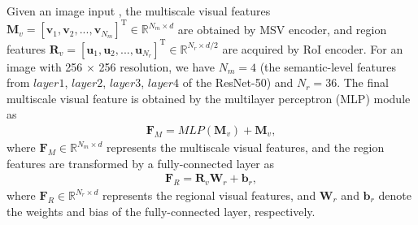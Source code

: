 \documentclass[journal]{IEEEtran}
\begin{document}
Given an image input , the multiscale visual features $\bm{M}_v=[\bm{v}_1, \bm{v}_2,...,\bm{v}_{N_m}]^{\mathrm{T}} \in \mathbb{R}^{N_m \times d}$ are obtained by MSV encoder, and region features $\bm{R}_v=[\bm{u}_1, \bm{u}_2,...,\bm{u}_{N_r}]^{\mathrm{T}} \in \mathbb{R}^{N_r \times d/2}$ are acquired by RoI encoder. For an image with 256 $\times$ 256 resolution, we have $N_m=4$ (the semantic-level features from $layer1$, $layer2$, $layer3$, $layer4$ of the ResNet-50) and $N_r=36$. The final multiscale visual feature is obtained by the multilayer perceptron (MLP) module as
\begin{equation}
\begin{aligned}
\bm{F}_M = M L P\left(\bm{M}_v\right) + \bm{M}_v,
\end{aligned}
\end{equation}
where $\bm{F}_M \in \mathbb{R}^{N_m \times d}$ represents the multiscale visual features, and the region features are transformed by a fully-connected layer as
\begin{equation}
\begin{aligned}
\bm{F}_R = \bm{R}_v \bm{W}_r + \bm{b}_r,
\end{aligned}
\end{equation}
where $\bm{F}_R \in \mathbb{R}^{N_r \times d}$ represents the regional visual features, and $\bm{W}_r$ and $\bm{b}_r$ denote the weights and bias of the fully-connected layer, respectively.
\end{document}
